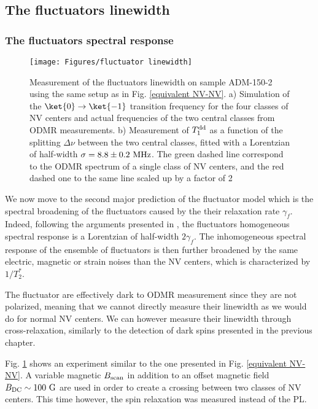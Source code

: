 \documentclass[a4paper,11pt]{report}
\begin{document}
\subsection{The fluctuators linewidth}

\subsubsection{The fluctuators spectral response}
\begin{figure}[h]
\centering
\texttt{[image: Figures/fluctuator linewidth]}
\caption{Measurement of the fluctuators linewidth on sample ADM-150-2 using the same setup as in Fig. \ref{equivalent NV-NV}. a) Simulation of the $\ket{0} \to \ket{-1}$ transition frequency for the four classes of NV centers and actual frequencies of the two central classes from ODMR measurements. b) Measurement of $T_1^{\rm dd}$ as a function of the splitting $\Delta \nu$ between the two central classes, fitted with a Lorentzian of half-width $\sigma=8.8 \pm 0.2\ \rm MHz$. The green dashed line correspond to the ODMR spectrum of a single class of NV centers, and the red dashed one to the same line scaled up by a factor of 2}
\label{fluct linewidth}
\end{figure}

We now move to the second major prediction of the fluctuator model which is the spectral broadening of the fluctuators caused by the their relaxation rate $\gamma_f$. Indeed, following the arguments presented in \citep{choi2017depolarization}, the fluctuators homogeneous spectral response is a Lorentzian of half-width $2\gamma_f$. The inhomogeneous spectral response of the ensemble of fluctuators is then further broadened by the same electric, magnetic or strain noises than the NV centers, which is characterized by $1/T_2^*$.

The fluctuator are effectively dark to ODMR measurement since they are not polarized, meaning that we cannot directly measure their linewidth as we would do for normal NV centers. We can however measure their linewidth through cross-relaxation, similarly to the detection of dark spins presented in the previous chapter.

Fig. \ref{fluct linewidth} shows an experiment similar to the one presented in Fig. \ref{equivalent NV-NV}. A variable magnetic $B_{\rm scan}$ in addition to an offset magnetic field $B_{\rm DC} \sim 100\ \rm G$ are used in order to create a crossing between two classes of NV centers. This time however, the spin relaxation was measured instead of the PL.
\end{document}
